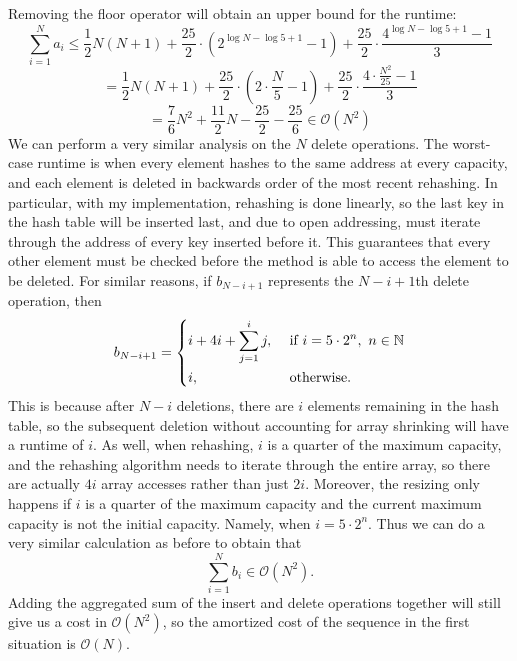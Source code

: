\documentclass[11pt]{article}
\begin{document}
    Removing the floor operator will obtain an upper bound for the runtime:
    \[
        \sum_{i=1}^{N} a_i \leq \frac{1}{2}N(N+1)+\frac{25}{2} \cdot (2^{\log N - \log 5 + 1} - 1) + \frac{25}{2} \cdot \frac{4^{\log N - \log 5 + 1} - 1}{3}
    \]
    \[
        = \frac{1}{2}N(N+1)+\frac{25}{2} \cdot \left(2 \cdot \frac{N}{5} - 1\right) + \frac{25}{2} \cdot \frac{4 \cdot \frac{N^2}{25} - 1}{3}
    \]
    \[
        = \frac{7}{6}N^2 + \frac{11}{2}N - \frac{25}{2} - \frac{25}{6} \in \mathcal{O} (N^2)
    \]
    We can perform a very similar analysis on the \(N\) delete operations. The worst-case runtime is when every element hashes to the same address at every capacity, and each element is deleted in backwards order of the most recent rehashing. In particular, with my implementation, rehashing is done linearly, so the last key in the hash table will be inserted last, and due to open addressing, must iterate through the address of every key inserted before it. This guarantees that every other element must be checked before the method is able to access the element to be deleted. For similar reasons, if \(b_{N - i + 1}\) represents the \(N-i+1\)th delete operation, then
    \[
        b_{N-i+1} = \begin{dcases}
            i + 4i + \sum_{j=1}^{i} j, &\text{ if } i = 5 \cdot 2^{n}, \ n \in \mathbb{N}\\
            i, &\text{ otherwise} .
        \end{dcases}
    \]
    This is because after \(N-i\) deletions, there are \(i\) elements remaining in the hash table, so the subsequent deletion without accounting for array shrinking will have a runtime of \(i\). As well, when rehashing, \(i\) is a quarter of the maximum capacity, and the rehashing algorithm needs to iterate through the entire array, so there are actually \(4i\) array accesses rather than just \(2i\). Moreover, the resizing only happens if \(i\) is a quarter of the maximum capacity and the current maximum capacity is not the initial capacity. Namely, when \(i = 5 \cdot 2^n\). Thus we can do a very similar calculation as before to obtain that
    \[
        \sum_{i=1}^{N} b_i \in \mathcal{O} (N^2).
    \]
    Adding the aggregated sum of the insert and delete operations together will still give us a cost in \(\mathcal{O} (N^2)\), so the amortized cost of the sequence in the first situation is \(\mathcal{O} (N)\).
\end{document}
